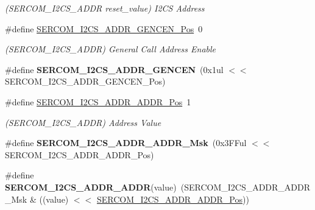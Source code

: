 \begin{DoxyCompactItemize}
\begin{DoxyCompactList}\small\item\em (S\+E\+R\+C\+O\+M\+\_\+\+I2\+C\+S\+\_\+\+A\+D\+D\+R reset\+\_\+value) I2\+C\+S Address \end{DoxyCompactList}\item 
\hypertarget{group___s_a_m_l21___s_e_r_c_o_m_ga4fab851205ca385c987b502accf4c888}{}\#define \hyperlink{group___s_a_m_l21___s_e_r_c_o_m_ga4fab851205ca385c987b502accf4c888}{S\+E\+R\+C\+O\+M\+\_\+\+I2\+C\+S\+\_\+\+A\+D\+D\+R\+\_\+\+G\+E\+N\+C\+E\+N\+\_\+\+Pos}~0\label{group___s_a_m_l21___s_e_r_c_o_m_ga4fab851205ca385c987b502accf4c888}

\begin{DoxyCompactList}\small\item\em (S\+E\+R\+C\+O\+M\+\_\+\+I2\+C\+S\+\_\+\+A\+D\+D\+R) General Call Address Enable \end{DoxyCompactList}\item 
\hypertarget{group___s_a_m_l21___s_e_r_c_o_m_ga80d3b7abd0dd7ff8bea028380b42449e}{}\#define {\bfseries S\+E\+R\+C\+O\+M\+\_\+\+I2\+C\+S\+\_\+\+A\+D\+D\+R\+\_\+\+G\+E\+N\+C\+E\+N}~(0x1ul $<$$<$ S\+E\+R\+C\+O\+M\+\_\+\+I2\+C\+S\+\_\+\+A\+D\+D\+R\+\_\+\+G\+E\+N\+C\+E\+N\+\_\+\+Pos)\label{group___s_a_m_l21___s_e_r_c_o_m_ga80d3b7abd0dd7ff8bea028380b42449e}

\item 
\hypertarget{group___s_a_m_l21___s_e_r_c_o_m_gad81283c820cb340d9f7913201029811a}{}\#define \hyperlink{group___s_a_m_l21___s_e_r_c_o_m_gad81283c820cb340d9f7913201029811a}{S\+E\+R\+C\+O\+M\+\_\+\+I2\+C\+S\+\_\+\+A\+D\+D\+R\+\_\+\+A\+D\+D\+R\+\_\+\+Pos}~1\label{group___s_a_m_l21___s_e_r_c_o_m_gad81283c820cb340d9f7913201029811a}

\begin{DoxyCompactList}\small\item\em (S\+E\+R\+C\+O\+M\+\_\+\+I2\+C\+S\+\_\+\+A\+D\+D\+R) Address Value \end{DoxyCompactList}\item 
\hypertarget{group___s_a_m_l21___s_e_r_c_o_m_gabf9e2354c63d5456871d34f428d00761}{}\#define {\bfseries S\+E\+R\+C\+O\+M\+\_\+\+I2\+C\+S\+\_\+\+A\+D\+D\+R\+\_\+\+A\+D\+D\+R\+\_\+\+Msk}~(0x3\+F\+Ful $<$$<$ S\+E\+R\+C\+O\+M\+\_\+\+I2\+C\+S\+\_\+\+A\+D\+D\+R\+\_\+\+A\+D\+D\+R\+\_\+\+Pos)\label{group___s_a_m_l21___s_e_r_c_o_m_gabf9e2354c63d5456871d34f428d00761}

\item 
\hypertarget{group___s_a_m_l21___s_e_r_c_o_m_ga66a0837da0253de94d64ffc3702cc5af}{}\#define {\bfseries S\+E\+R\+C\+O\+M\+\_\+\+I2\+C\+S\+\_\+\+A\+D\+D\+R\+\_\+\+A\+D\+D\+R}(value)~(S\+E\+R\+C\+O\+M\+\_\+\+I2\+C\+S\+\_\+\+A\+D\+D\+R\+\_\+\+A\+D\+D\+R\+\_\+\+Msk \& ((value) $<$$<$ \hyperlink{group___s_a_m_l21___s_e_r_c_o_m_gad81283c820cb340d9f7913201029811a}{S\+E\+R\+C\+O\+M\+\_\+\+I2\+C\+S\+\_\+\+A\+D\+D\+R\+\_\+\+A\+D\+D\+R\+\_\+\+Pos}))\label{group___s_a_m_l21___s_e_r_c_o_m_ga66a0837da0253de94d64ffc3702cc5af}


\end{DoxyCompactItemize}
